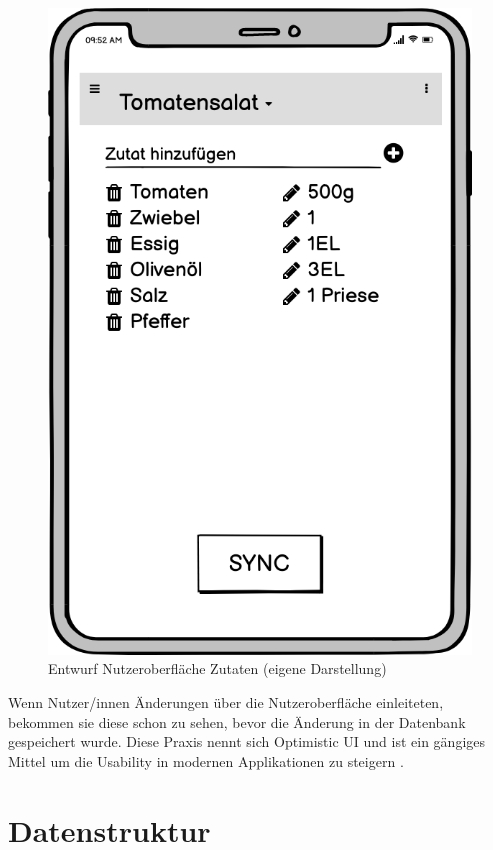 \documentclass[a4paper, 12pt]{scrreprt}
\begin{document}
\begin{figure}[H]
\begin{minipage}{.45\textwidth}
		\includegraphics[width=1\textwidth]{wireframeZutaten2.png}
		\caption[Entwurf Nutzeroberfläche Zutaten]{Entwurf Nutzeroberfläche Zutaten (eigene Darstellung)}
		\label{fig:zutatenFrame}
	\end{minipage}
\end{figure}

\label{sec:optimisticUI}
Wenn Nutzer/innen Änderungen über die Nutzeroberfläche einleiteten, bekommen sie diese schon zu sehen, bevor die Änderung in der Datenbank gespeichert wurde. Diese Praxis nennt sich Optimistic UI und ist ein gängiges Mittel um die Usability in modernen Applikationen zu steigern \autocite{ArticleOptimisticUI}.

\section{Datenstruktur}
\label{sec:Datenstruktur}
\end{document}
